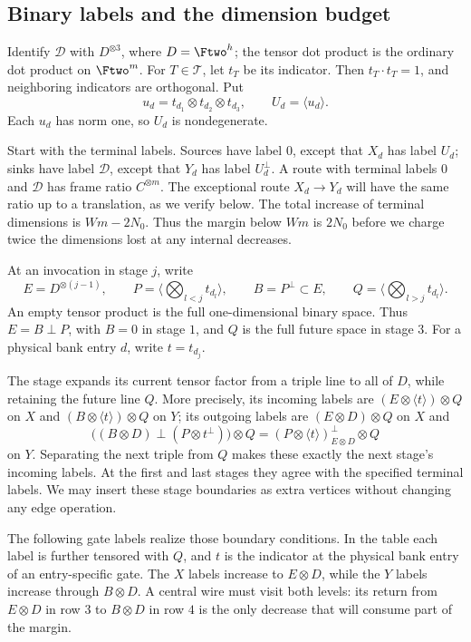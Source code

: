 \subsection{Binary labels and the dimension budget}

Identify $\mathcal D$ with $D^{\otimes3}$, where $D=\Ftwo^h$;
the tensor dot product is the ordinary dot product on $\Ftwo^m$.
For $T\in\mathcal T$, let $t_T$ be its indicator.
Then $t_T\cdot t_T=1$, and neighboring indicators are orthogonal.
Put
\[
 u_d=t_{d_1}\otimes t_{d_2}\otimes t_{d_3},\qquad
 U_d=\langle u_d\rangle.
\]
Each $u_d$ has norm one, so $U_d$ is nondegenerate.

Start with the terminal labels.  Sources have label $0$, except that
$X_d$ has label $U_d$; sinks have label $\mathcal D$, except that
$Y_d$ has label $U_d^\perp$.  A route with terminal labels $0$ and
$\mathcal D$ has frame ratio $C^{\otimes m}$.  The exceptional
route $X_d\to Y_d$ will have the same ratio up to a translation, as
we verify below.  The total increase of terminal dimensions is
$Wm-2N_0$.  Thus the margin below $Wm$ is $2N_0$ before we
charge twice the dimensions lost at any internal decreases.

At an invocation in stage $j$, write
\[
 E=D^{\otimes(j-1)},\qquad
 P=\Big\langle\bigotimes_{l<j}t_{d_l}\Big\rangle,
 \qquad B=P^\perp\subset E,\qquad
 Q=\Big\langle\bigotimes_{l>j}t_{d_l}\Big\rangle.
\]
An empty tensor product is the full one-dimensional binary space.
Thus $E=B\mathbin\perp P$, with $B=0$ in stage $1$, and $Q$ is
the full future space in stage $3$.
For a physical bank entry $d$, write $t=t_{d_j}$.

The stage expands its current tensor factor from a triple line to
all of $D$, while retaining the future line $Q$.  More precisely,
its incoming labels are
$(E\otimes\langle t\rangle)\otimes Q$ on $X$ and
$(B\otimes\langle t\rangle)\otimes Q$ on $Y$; its outgoing
labels are $(E\otimes D)\otimes Q$ on $X$ and
\[
 \bigl((B\otimes D)\mathbin\perp(P\otimes t^\perp)\bigr)\otimes Q
 = (P\otimes\langle t\rangle)^\perp_{E\otimes D}\otimes Q
\]
on $Y$.  Separating the next triple from $Q$ makes these exactly
the next stage's incoming labels.  At the first and last stages
they agree with the specified terminal labels.  We may insert these
stage boundaries as extra vertices without changing any edge operation.

The following gate labels realize those boundary conditions.  In the
table each label is further tensored with $Q$, and $t$ is the
indicator at the physical bank entry of an entry-specific gate.
The $X$ labels increase to $E\otimes D$, while the $Y$ labels
increase through $B\otimes D$.  A central wire must visit both
levels: its return from $E\otimes D$ in row $3$ to $B\otimes D$
in row $4$ is the only decrease that will consume part of the margin.

